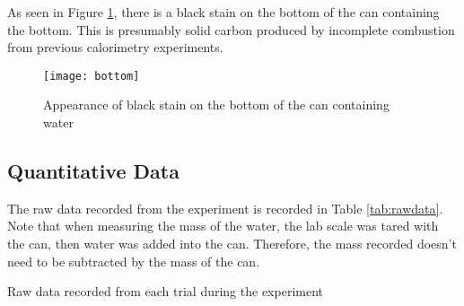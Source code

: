 \documentclass[
	letterpaper, %
	12pt, %
]{CSUniSchoolLabReport}
\begin{document}
\par As seen in Figure \ref*{fig:canbottom}, there is a black stain on the bottom of the can
containing the bottom. This is presumably solid carbon produced by incomplete combustion
from previous calorimetry experiments.
\begin{figure}[H]
  \centering
  \texttt{[image: bottom]}
  \caption{Appearance of black stain on the bottom of the can containing water}
  \label{fig:canbottom}
\end{figure}

\subsection{Quantitative Data}

\par The raw data recorded from the experiment is recorded in Table \ref*{tab:rawdata}.
Note that when measuring the mass of the water, the lab scale was tared
with the can, then water was added into the can. Therefore, the mass recorded
doesn't need to be subtracted by the mass of the can.

\begin{table}[H]
  \centering
  \caption{Raw data recorded from each trial during the experiment}
  \label{tab:rawdata}
\end{table}
\end{document}
